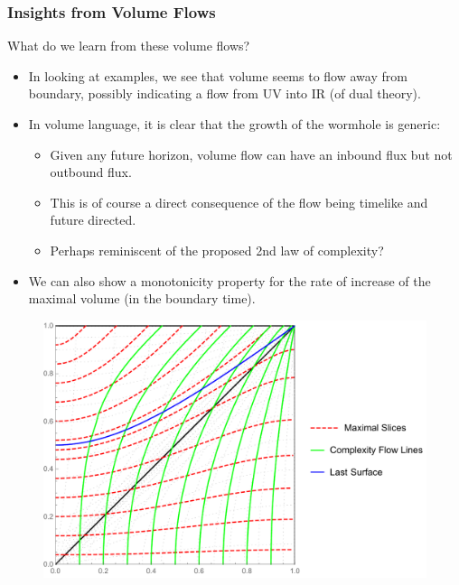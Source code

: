\documentclass[8pt,aspectratio=169]{beamer}
\begin{document}
\begin{frame}
\frametitle{Insights from Volume Flows}

\begin{minipage}[t]{0.55\linewidth}

What do we learn from these volume flows?

\begin{itemize}

\item In looking at examples, we see that volume seems to flow away from boundary, possibly indicating a flow from UV into IR (of dual theory).

\item In volume language, it is clear that the growth of the wormhole is generic:

	\begin{itemize}

	\item Given any future horizon, volume flow can have an inbound flux but not outbound flux.
	
	\item This is of course a direct consequence of the flow being timelike and future directed.
	
	\item Perhaps reminiscent of the proposed 2nd law of complexity?

	\end{itemize}
	
\item We can also show a monotonicity property for the rate of increase of the maximal volume (in the boundary time).

\end{itemize}

\end{minipage}\hfill
%
\begin{minipage}[t]{0.44\linewidth}

\begin{figure}
    \begin{center}
    
        \includegraphics[scale=0.35]{VolumeFlowDisplay}    
    

\end{center}
\end{figure}
\end{minipage}
\end{frame}
\end{document}
